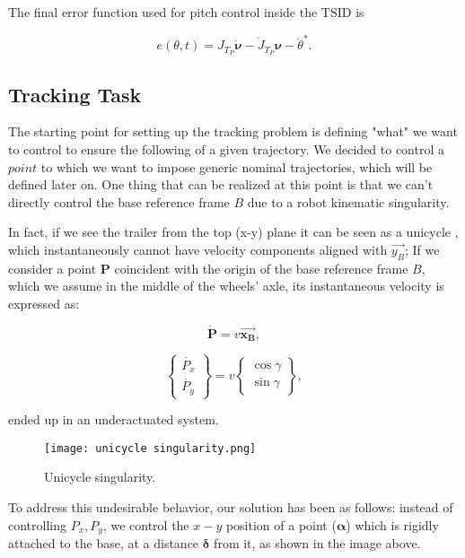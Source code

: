 The final error function used for pitch control inside the TSID is 

\begin{equation}
   e(\theta,t) = J_{T_P}{\dot{\bm{\nu}}} - \dot{J}_{T_P}\bm{\nu} - \ddot{\theta}^{*}. 
    \label{eq: Pitch error task}
\end{equation}

\subsection{Tracking Task}
\label{subsec:Tracking Task}

The starting point for setting up the tracking problem is defining "what" we want to control to ensure the following of a given trajectory.
We decided to control a $point$ to which we want to impose generic nominal trajectories, which will be defined later on.
One thing that can be realized at this point is that we can't directly control the base reference frame $B$ due to a robot kinematic singularity.

In fact, if we see the trailer from the top (x-y) plane it can be seen as a unicycle \cite{ZHOU202354}, which instantaneously cannot have velocity components aligned with $\vec{y_B}$;
If we consider a point $\mathbf{P}$ coincident with the origin of the base reference frame $B$, which we assume in the middle of the wheels' axle, its instantaneous velocity is expressed as:

$$ \dot{\mathbf{P}} = v \vec{\bm{x_B}},$$

$$ \begin{Bmatrix}
\dot{P_x} \\
\dot{P_y}
\end{Bmatrix} = v \begin{Bmatrix}
\cos\gamma \\
\sin\gamma
\end{Bmatrix},
$$

ended up in an underactuated system.

\begin{figure}
    \centering
    \texttt{[image: unicycle singularity.png]}
    \caption{Unicycle singularity.}
    \label{fig:Unicycle singularity}
\end{figure}


To address this undesirable behavior, our solution has been as follows: instead of controlling $P_x , P_y$, we control the $x-y$ position of a point ($\bm{\alpha}$) which is rigidly attached to the base, at a distance $\bm{\delta}$ from it, as shown in the image above. 

